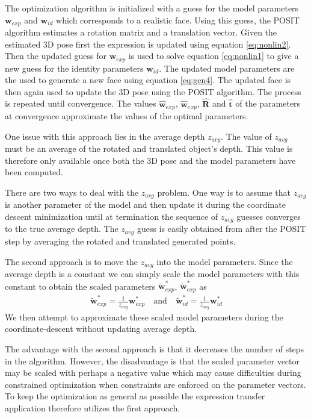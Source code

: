 \documentclass[11pt,a4paper]{report}
\begin{document}
The optimization algorithm is initialized with a guess for the
model parameters $\mathbf{w}_{exp}$ and $\mathbf{w}_{id}$ which corresponds
to a realistic face. Using this guess, the POSIT algorithm estimates a rotation
matrix and a translation vector. Given the estimated 3D pose first the
expression is updated using equation \ref{eq:nonlin2}. Then the updated guess
for $\mathbf{w}_{exp}$ is used to solve equation \ref{eq:nonlin1} to give a new
guess for the identity parameters $\mathbf{w}_{id}$. The updated model
parameters are the used to generate a new face using equation
\ref{eq:gen4}. The updated face is then again used to update the 3D pose using
the POSIT algorithm. The process is repeated until convergence. The values $\mathbf{\hat{w}}_{exp}$, $\mathbf{\hat{w}}_{exp}$,
$\mathbf{\hat{R}}$ and $\mathbf{\hat{t}}$ of the parameters at convergence
approximate the values of the optimal parameters.

One issue with this approach lies in the average depth $z_{avg}$. The value of
$z_{avg}$ must be an average of the rotated and translated object's depth. This
value is therefore only available once both the 3D pose and the model
parameters have been computed.

There are two ways to deal with the $z_{avg}$ problem. One way is to assume that
$z_{avg}$ is another parameter of the model and then update it during the coordinate
descent minimization until at termination the sequence of $z_{avg}$ guesses
converges to the true average depth. The $z_{avg}$ guess is easily obtained from
after the POSIT step by averaging the rotated and translated generated points.

The second approach is to move the $z_{avg}$ into the model parameters. Since
the average depth is a constant we can simply scale the model parameters with
this constant to obtain the scaled parameters $\mathbf{\tilde{w}}^*_{exp}$,
$\mathbf{\tilde{w}}^*_{exp}$ as
\begin{align*}
\mathbf{\tilde{w}}^*_{exp} = \frac{1}{z_{avg}}\mathbf{w}^*_{exp} \quad
\textrm{and} \quad
\mathbf{\tilde{w}}^*_{id} = \frac{1}{z_{avg}}\mathbf{w}^*_{id}
\end{align*}
We then attempt to approximate these scaled model parameters during the
coordinate-descent without updating average depth.

The advantage with the second approach is that it decreases the number of steps in
the algorithm. However, the disadvantage is that the scaled parameter vector may
be scaled with perhaps a negative value which may cause difficulties during constrained
optimization when constraints are enforced on the parameter vectors. To keep the
optimization as general as possible the expression transfer application
therefore utilizes the first approach.
\end{document}
